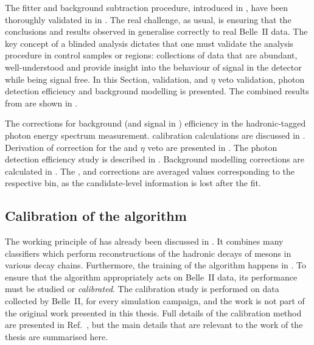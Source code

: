 The fitter and background subtraction procedure, introduced in ,
have been thoroughly validated in  in \MC.
The real challenge, as usual, is ensuring that the conclusions and results observed in \MC generalise correctly to real Belle~II data.
The key concept of a blinded analysis dictates that one must validate the analysis procedure in control samples or regions: collections of data that are abundant, well-understood and provide insight into the behaviour of signal in the detector while being signal free.
In this Section, \FEI validation, 
\piz and $\eta$ veto validation, photon detection efficiency and background modelling is presented.
The combined results from  are shown in .

\begin{table}[htbp!]
    \centering
    \caption{\label{tab:correction_table} The corrections for background (and signal in ) efficiency in the hadronic-tagged \BtoXsgamma photon energy spectrum measurement.
    \FEI calibration calculations are discussed in .
    Derivation of correction for the \piz and $\eta$ veto are presented in .
    The photon detection efficiency study is described in .
    Background modelling corrections are calculated in .
    The \FEI, \piz and \g corrections are averaged values corresponding to the respective \EB bin,
    as the candidate-level information is lost after the \Mbc fit.
    }
    
\end{table}


\subsection{Calibration of the \texorpdfstring{\FEI}{FEI} algorithm}\label{sec:fei_calibration}

The working principle of \FEI has already been discussed in .
It combines many classifiers which perform reconstructions of the hadronic decays of \B mesons in various decay chains.
Furthermore, the training of the algorithm happens in \MC.
To ensure that the algorithm appropriately acts on Belle~II data, its performance must be studied or \textit{calibrated}.
The calibration study is performed on data collected by Belle~II, for every simulation campaign, and the work is not part of the original work presented in this thesis.
Full details of the calibration method are presented in Ref.~\cite{Belle-II:2020fst}, but the main details that are relevant to the work of the thesis are summarised here.

